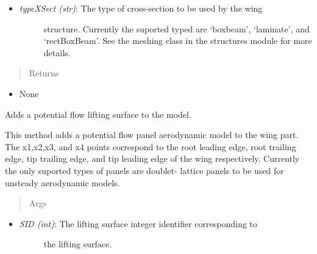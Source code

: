 \documentclass[letterpaper,10pt,english]{sphinxmanual}
\begin{document}
\begin{fulllineitems}
\begin{fulllineitems}
\begin{itemize}
\begin{description}
\end{description}

\item {} \begin{description}
\item[{\emph{typeXSect (str)}: The type of cross-section to be used by the wing}] \leavevmode
structure. Currently the suported typed are `boxbeam', `laminate',
and `rectBoxBeam'. See the meshing class in the structures module
for more details.

\end{description}

\end{itemize}
\begin{quote}\begin{description}
\item[{Returns}] \leavevmode
\end{description}\end{quote}
\begin{itemize}
\item {} 
None

\end{itemize}

\end{fulllineitems}


\begin{fulllineitems}
\label{AircraftParts:AeroComBAT.AircraftParts.Wing.addLiftingSurface}
Adds a potential flow lifting surface to the model.

This method adds a potential flow panel aerodynamic model to the wing
part. The x1,x2,x3, and x4 points correspond to the root leading edge,
root trailing edge, tip trailing edge, and tip leading edge of the wing
respectively. Currently the only suported types of panels are doublet-
lattice panels to be used for unsteady aerodynamic models.
\begin{quote}\begin{description}
\item[{Args}] \leavevmode
\end{description}\end{quote}
\begin{itemize}
\item {} \begin{description}
\item[{\emph{SID (int)}: The lifting surface integer identifier corresponding to}] \leavevmode
the lifting surface.


\end{description}
\end{itemize}
\end{fulllineitems}
\end{fulllineitems}
\end{document}
